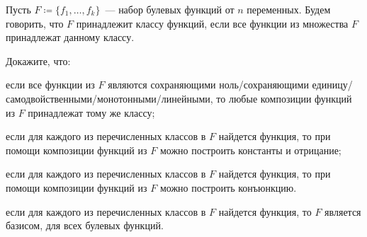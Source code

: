 Пусть $F \coloneqq \{f_1, \dots, f_k\}$~--- набор булевых функций от $n$ переменных. Будем говорить, что
$F$ принадлежит классу функций, если все функции из множества $F$ принадлежат данному классу.

Докажите, что:
\begin{enumcyr}
    \item если все функции из $F$ являются сохраняющими ноль/сохраняющими
        единицу/самодвойственными/монотонными/линейными, то любые композиции функций из $F$ принадлежат
        тому же классу;
    \item если для каждого из перечисленных классов в $F$ найдется функция, то при помощи композиции
        функций из $F$ можно построить константы и отрицание;
    \item если для каждого из перечисленных классов в $F$ найдется функция, то при помощи композиции
        функций из $F$ можно построить конъюнкцию.
    \item если для каждого из перечисленных классов в $F$ найдется функция, то $F$ является базисом, для
        всех булевых функций.
\end{enumcyr}